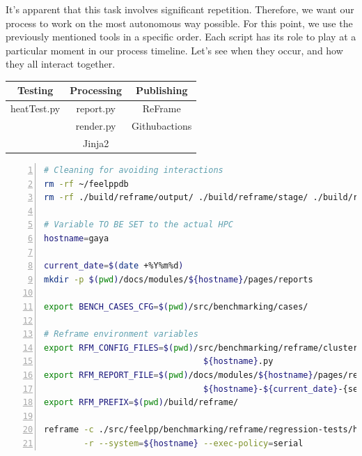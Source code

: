 \documentclass[12pt]{article}
\begin{document}
It's apparent that this task involves significant repetition. Therefore, we want our process to work on the most autonomous way possible.
For this point, we use the previously mentioned tools in a specific order. Each script has its role to play at a particular moment in our process timeline.
Let's see when they occur, and how they all interact together.

\begin{table}[h!]
    \centering
    \begin{tabular}{|c|c|c|}
    \hline
    Testing & Processing & Publishing \\
    \hline
    heatTest.py & report.py & ReFrame \\
     & render.py & Githubactions \\
     & Jinja2 & \\
    \hline
    \end{tabular}

\end{table}

\begin{lstlisting}[language=bash,caption={Script for process launching},label={lst:script},frame=single,basicstyle=\footnotesize\ttfamily,keywordstyle=\color{blue},commentstyle=\color{green!60!black},stringstyle=\color{red},numbers=left,numberstyle=\tiny\color{gray}]
# Cleaning for avoiding interactions
rm -rf ~/feelppdb
rm -rf ./build/reframe/output/ ./build/reframe/stage/ ./build/reframe/perflogs

# Variable TO BE SET to the actual HPC
hostname=gaya

current_date=$(date +%Y%m%d)
mkdir -p $(pwd)/docs/modules/${hostname}/pages/reports

export BENCH_CASES_CFG=$(pwd)/src/benchmarking/cases/

# Reframe environment variables
export RFM_CONFIG_FILES=$(pwd)/src/benchmarking/reframe/cluster-config/ \
                                ${hostname}.py
export RFM_REPORT_FILE=$(pwd)/docs/modules/${hostname}/pages/reports/ \
                                ${hostname}-${current_date}-{sessionid}.json
export RFM_PREFIX=$(pwd)/build/reframe/

reframe -c ./src/feelpp/benchmarking/reframe/regression-tests/heatTest.py \
        -r --system=${hostname} --exec-policy=serial
\end{lstlisting}
\end{document}
